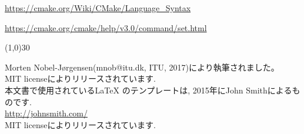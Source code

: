 \documentclass[11pt,a4paper,landscape]{ltjsarticle}
\begin{document}
\begin{multicols}{2}
\url{https://cmake.org/Wiki/CMake/Language_Syntax}

\url{https://cmake.org/cmake/help/v3.0/command/set.html}


\vspace{\baselineskip}
\linethickness{0.5mm} %
{\color{mygray}\line(1,0){30}} %

\footnotesize{
Morten Nobel-Jørgensen(mnob@itu.dk, ITU, 2017)により執筆されました。\\ 
MIT licenseによりリリースされています. \\

本文書で使用されている{\LaTeX} のテンプレートは, 2015年にJohn Smithによるものです.\\ 
\url{http://johnsmith.com/}\\
				
MIT licenseによりリリースされています. 
}

\end{multicols}

\end{document}
